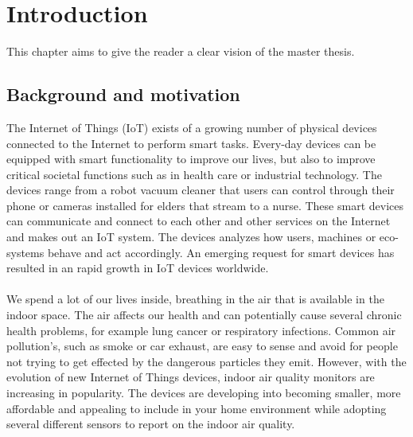 \chapter*{Introduction}
This chapter aims to give the reader a clear vision of the master thesis.  
\section*{Background and motivation}
The Internet of Things (IoT) exists of a growing number of physical devices connected to the Internet to perform smart tasks. \cite{IoTSurveyAl-Fuqaha} Every-day devices can be equipped with smart functionality to improve our lives, but also to improve critical societal functions such as in health care or industrial technology. The devices range from a robot vacuum cleaner that users can control through their phone or cameras installed for elders that stream to a nurse. These smart devices can communicate and connect to each other and other services on the Internet and makes out an IoT system. The devices analyzes how users, machines or eco-systems behave and act accordingly. An emerging request for smart devices has resulted in an rapid growth in IoT devices worldwide. \cite{IoTAndPrivacy}
\\\\
We spend a lot of our lives inside, breathing in the air that is available in the indoor space. \cite{IndoorAirQualityMonitorIoT} The air affects our health and can potentially cause several chronic health problems, for example lung cancer or respiratory infections. \cite{IAQMonitorReview} Common air pollution's, such as smoke or car exhaust,  are easy to sense and avoid for people not trying to get effected by the dangerous particles they emit. However, with the evolution of new Internet of Things devices, indoor air quality monitors are increasing in popularity. \cite{SecurityAndDataIntInAQM} The devices are developing into becoming smaller, more affordable and appealing to include in your home environment while adopting several different sensors to report on the indoor air quality. 

